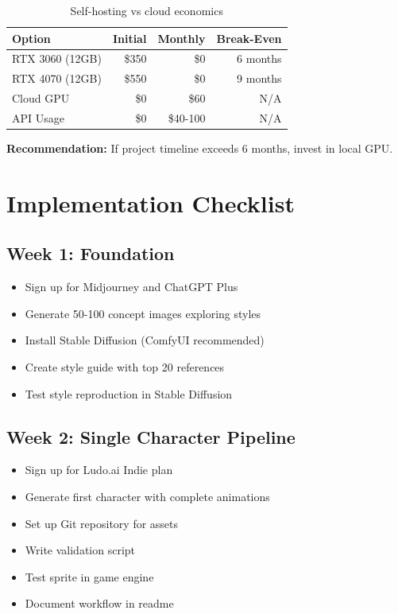 \documentclass[11pt]{article}
\begin{document}
\begin{table}[H]
\centering
\begin{tabular}{lrrr}
\toprule
\textbf{Option} & \textbf{Initial} & \textbf{Monthly} & \textbf{Break-Even} \\
\midrule
RTX 3060 (12GB) & \$350 & \$0 & 6 months \\
RTX 4070 (12GB) & \$550 & \$0 & 9 months \\
Cloud GPU & \$0 & \$60 & N/A \\
API Usage & \$0 & \$40-100 & N/A \\
\bottomrule
\end{tabular}
\caption{Self-hosting vs cloud economics}
\end{table}

\textbf{Recommendation:} If project timeline exceeds 6 months, invest in local GPU.

\section{Implementation Checklist}

\subsection{Week 1: Foundation}

\begin{itemize}[label=$\square$]
    \item Sign up for Midjourney and ChatGPT Plus
    \item Generate 50-100 concept images exploring styles
    \item Install Stable Diffusion (ComfyUI recommended)
    \item Create style guide with top 20 references
    \item Test style reproduction in Stable Diffusion
\end{itemize}

\subsection{Week 2: Single Character Pipeline}

\begin{itemize}[label=$\square$]
    \item Sign up for Ludo.ai Indie plan
    \item Generate first character with complete animations
    \item Set up Git repository for assets
    \item Write validation script
    \item Test sprite in game engine
    \item Document workflow in readme
\end{itemize}
\end{document}
